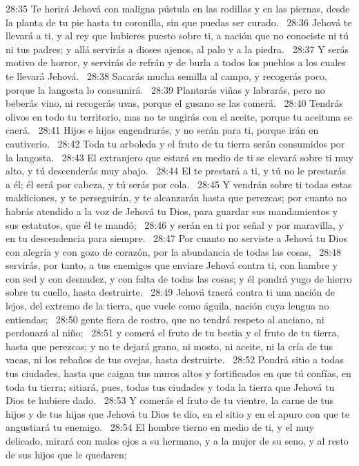 28:35 Te herirá Jehová con maligna pústula en las rodillas y en las piernas, desde la planta de tu pie hasta tu coronilla, sin que puedas ser curado.  
28:36 Jehová te llevará a ti, y al rey que hubieres puesto sobre ti, a nación que no conociste ni tú ni tus padres; y allá servirás a dioses ajenos, al palo y a la piedra.  
28:37 Y serás motivo de horror, y servirás de refrán y de burla a todos los pueblos a los cuales te llevará Jehová.  
28:38 Sacarás mucha semilla al campo, y recogerás poco, porque la langosta lo consumirá.  
28:39 Plantarás viñas y labrarás, pero no beberás vino, ni recogerás uvas, porque el gusano se las comerá.  
28:40 Tendrás olivos en todo tu territorio, mas no te ungirás con el aceite, porque tu aceituna se caerá.  
28:41 Hijos e hijas engendrarás, y no serán para ti, porque irán en cautiverio.  
28:42 Toda tu arboleda y el fruto de tu tierra serán consumidos por la langosta.  
28:43 El extranjero que estará en medio de ti se elevará sobre ti muy alto, y tú descenderás muy abajo.  
28:44 El te prestará a ti, y tú no le prestarás a él; él será por cabeza, y tú serás por cola.  
28:45 Y vendrán sobre ti todas estas maldiciones, y te perseguirán, y te alcanzarán hasta que perezcas; por cuanto no habrás atendido a la voz de Jehová tu Dios, para guardar sus mandamientos y sus estatutos, que él te mandó;  
28:46 y serán en ti por señal y por maravilla, y en tu descendencia para siempre.  
28:47 Por cuanto no serviste a Jehová tu Dios con alegría y con gozo de corazón, por la abundancia de todas las cosas,  
28:48 servirás, por tanto, a tus enemigos que enviare Jehová contra ti, con hambre y con sed y con desnudez, y con falta de todas las cosas; y él pondrá yugo de hierro sobre tu cuello, hasta destruirte.  
28:49 Jehová traerá contra ti una nación de lejos, del extremo de la tierra, que vuele como águila, nación cuya lengua no entiendas;  
28:50 gente fiera de rostro, que no tendrá respeto al anciano, ni perdonará al niño;  
28:51 y comerá el fruto de tu bestia y el fruto de tu tierra, hasta que perezcas; y no te dejará grano, ni mosto, ni aceite, ni la cría de tus vacas, ni los rebaños de tus ovejas, hasta destruirte.  
28:52 Pondrá sitio a todas tus ciudades, hasta que caigan tus muros altos y fortificados en que tú confías, en toda tu tierra; sitiará, pues, todas tus ciudades y toda la tierra que Jehová tu Dios te hubiere dado.  
28:53 Y comerás el fruto de tu vientre, la carne de tus hijos y de tus hijas que Jehová tu Dios te dio, en el sitio y en el apuro con que te angustiará tu enemigo.  
28:54 El hombre tierno en medio de ti, y el muy delicado, mirará con malos ojos a su hermano, y a la mujer de su seno, y al resto de sus hijos que le quedaren;  
